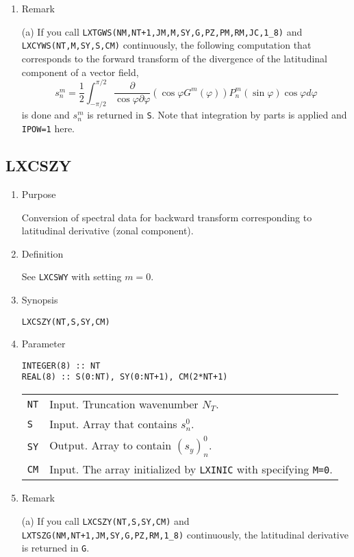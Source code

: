 \documentclass[a4paper]{scrartcl}
\begin{document}
\begin{enumerate}
\item Remark

(a) If you call \texttt{LXTGWS(NM,NT+1,JM,M,SY,G,PZ,PM,RM,JC,1\_8)} and
  \texttt{LXCYWS(NT,M,SY,S,CM)}  continuously,
    the following computation that corresponds to
    the forward transform of the divergence of the latitudinal
    component of a vector field,  
\begin{equation}
s^m_n=\frac1{2}\int^{\pi/2}_{-\pi/2}
\frac{\partial}{\cos\varphi\partial\varphi}
\left(\cos\varphi G^m(\varphi)\right)
P^m_n(\sin\varphi)\cos\varphi d\varphi
\end{equation}
is done and $s^m_n$ is returned in \texttt{S}.
Note that integration by parts is applied and \texttt{IPOW=1} here.
  
\end{enumerate}

\subsection{LXCSZY}

\begin{enumerate}

\item Purpose 

Conversion of spectral data for backward transform
corresponding to latitudinal derivative (zonal component).

\item Definition
  

See \texttt{LXCSWY} with setting $m=0$.

\item Synopsis
    
\texttt{LXCSZY(NT,S,SY,CM)}
  
\item Parameter

\begin{verbatim}
INTEGER(8) :: NT
REAL(8) :: S(0:NT), SY(0:NT+1), CM(2*NT+1)
\end{verbatim}

\begin{tabular}{ll}
\texttt{NT} & Input. Truncation wavenumber $N_T$.\\
\texttt{S} & Input. Array that contains $s^0_n$.\\
\texttt{SY} & Output. Array to contain $(s_y)^0_n$.\\
\texttt{CM}  & Input. The array initialized by \texttt{LXINIC}
with specifying \texttt{M=0}.
\end{tabular}

\item Remark

(a) If you call \texttt{LXCSZY(NT,S,SY,CM)} and 
  \texttt{LXTSZG(NM,NT+1,JM,SY,G,PZ,RM,1\_8)}
 continuously, the latitudinal derivative is returned in \texttt{G}.    

\end{enumerate}
\end{document}
